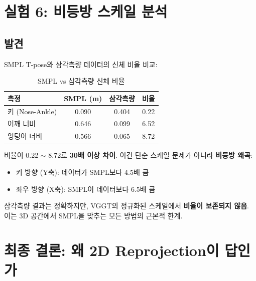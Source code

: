 \documentclass[11pt, a4paper]{report}
\begin{document}
\chapter{실험 6: 비등방 스케일 분석}

\section{발견}

SMPL T-pose와 삼각측량 데이터의 신체 비율 비교:

\begin{table}[H]
\centering
\caption{SMPL vs 삼각측량 신체 비율}
\renewcommand{\arraystretch}{1.3}
\begin{tabular}{l cc c}
\toprule
\textbf{측정} & \textbf{SMPL (m)} & \textbf{삼각측량} & \textbf{비율} \\
\midrule
키 (Nose-Ankle) & 0.090 & 0.404 & 0.22 \\
어깨 너비 & 0.646 & 0.099 & 6.52 \\
엉덩이 너비 & 0.566 & 0.065 & 8.72 \\
\bottomrule
\end{tabular}
\end{table}

\begin{warningbox}
비율이 0.22 $\sim$ 8.72로 \textbf{30배 이상 차이}. 이건 단순 스케일 문제가 아니라 \textbf{비등방 왜곡}:
\begin{itemize}[leftmargin=*]
  \item 키 방향 (Y축): 데이터가 SMPL보다 4.5배 큼
  \item 좌우 방향 (X축): SMPL이 데이터보다 6.5배 큼
\end{itemize}
\end{warningbox}

\begin{keyidea}
삼각측량 결과는 정확하지만, VGGT의 정규화된 스케일에서 \textbf{비율이 보존되지 않음}. 이는 3D 공간에서 SMPL을 맞추는 모든 방법의 근본적 한계.
\end{keyidea}


\chapter{최종 결론: 왜 2D Reprojection이 답인가}
\end{document}
